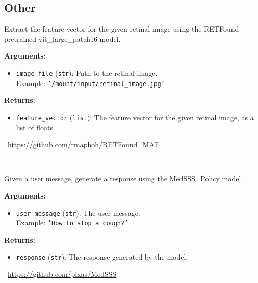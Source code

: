 \subsection{Other}
\label{app:tasks:imaging}
\begin{tcolorbox}[title={\texttt{retfound\_feature\_vector}}]
Extract the feature vector for the given retinal image using the RETFound pretrained vit\_large\_patch16 model.

\vspace{.5em}
\textbf{Arguments:}
\begin{itemize}[topsep=0pt,parsep=-1pt,partopsep=0pt]
\item \texttt{image\_file} (\texttt{str}): Path to the retinal image.\\  Example: \texttt{'/mount/input/retinal\_image.jpg'}
\end{itemize}

\vspace{.5em}
\textbf{Returns:} \begin{itemize}[topsep=0pt,parsep=-1pt,partopsep=0pt]
\item \texttt{feature\_vector} (\texttt{list}): The feature vector for the given retinal image, as a list of floats.
\end{itemize}
\tcblower
\setlength{\hangindent}{\widthof{\faGithub~}}
\faGithub~\url{https://github.com/rmaphoh/RETFound_MAE}

\vspace{.5em}\setlength{\hangindent}{\widthof{\faFile*[regular]~}}\faFile*[regular]~


\end{tcolorbox}

\label{app:tasks:llms}
\begin{tcolorbox}[title={\texttt{medsss\_generate}}]
Given a user message, generate a response using the MedSSS\_Policy model.

\vspace{.5em}
\textbf{Arguments:}
\begin{itemize}[topsep=0pt,parsep=-1pt,partopsep=0pt]
\item \texttt{user\_message} (\texttt{str}): The user message.\\  Example: \texttt{'How to stop a cough?'}
\end{itemize}

\vspace{.5em}
\textbf{Returns:} \begin{itemize}[topsep=0pt,parsep=-1pt,partopsep=0pt]
\item \texttt{response} (\texttt{str}): The response generated by the model.
\end{itemize}
\tcblower
\setlength{\hangindent}{\widthof{\faGithub~}}
\faGithub~\url{https://github.com/pixas/MedSSS}

\vspace{.5em}\setlength{\hangindent}{\widthof{\faFile*[regular]~}}\faFile*[regular]~


\end{tcolorbox}

